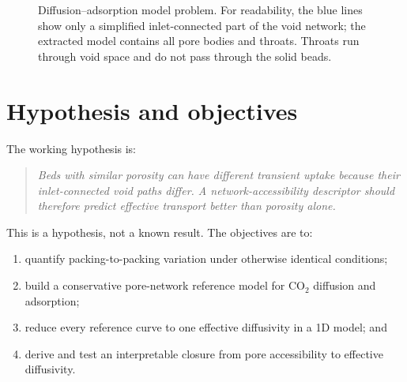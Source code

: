 \documentclass[10pt,a4paper]{article}
\begin{document}
\begin{figure}[!ht]
{%
}
\caption{Diffusion--adsorption model problem. For readability, the blue lines
show only a simplified inlet-connected part of the void network; the extracted
model contains all pore bodies and throats. Throats run through void space and
do not pass through the solid beads.}
\label{fig:problem}
\end{figure}

\newpage
\section{Hypothesis and objectives}
The working hypothesis is:
\begin{quote}\itshape
Beds with similar porosity can have different transient uptake because their
inlet-connected void paths differ. A network-accessibility descriptor should
therefore predict effective transport better than porosity alone.
\end{quote}
This is a hypothesis, not a known result. The objectives are to:
\begin{enumerate}
\item quantify packing-to-packing variation under otherwise identical conditions;
\item build a conservative pore-network reference model for CO$_2$ diffusion and adsorption;
\item reduce every reference curve to one effective diffusivity in a 1D model; and
\item derive and test an interpretable closure from pore accessibility to effective diffusivity.
\end{enumerate}
\end{document}
